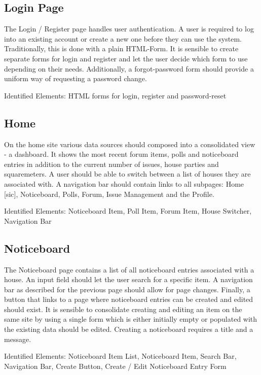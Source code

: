 \subsection{Login Page}
The Login / Register page handles user authentication. A user is required to log into an existing account or create a new one before they can use the system. Traditionally, this is done with a plain HTML-Form. It is sensible to create separate forms for login and register and let the user decide which form to use depending on their needs. Additionally, a forgot-password form should provide a uniform way of requesting a password change. \newline

Identified Elements: HTML forms for login, register and password-reset

\subsection{Home}
On the home site various data sources should composed into a consolidated view - a dashboard. It shows the most recent forum items, polls and noticeboard entries in addition to the current number of issues, house parties and squaremeters. A user should be able to switch between a list of houses they are associated with. A navigation bar should contain links to all subpages: Home [sic], Noticeboard, Polls, Forum, Issue Management and the Profile. \newline

Identified Elements: Noticeboard Item, Poll Item, Forum Item, House Switcher, Navigation Bar

\subsection{Noticeboard}
The Noticeboard page contains a list of all noticeboard entries associated with a house. An input field should let the user search for a specific item. A navigation bar as described for the previous page should allow for page changes. Finally, a button that links to a page where noticeboard entries can be created and edited should exist. It is sensible to consolidate creating and editing an item on the same site by using a single form which is either initially empty or populated with the existing data should be edited. Creating a noticeboard requires a title and a message. \newline

Identified Elements: Noticeboard Item List, Noticeboard Item, Search Bar, Navigation Bar, Create Button, Create / Edit Noticeboard Entry Form

